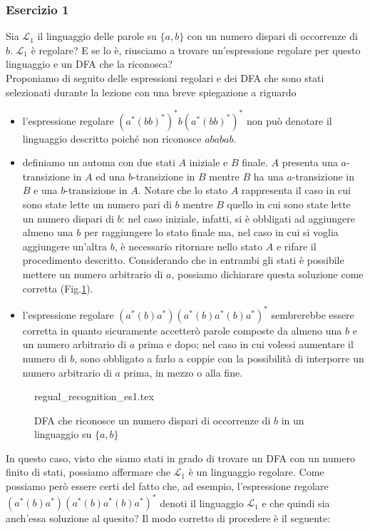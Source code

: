 \documentclass[class=book, crop=false, oneside, 12pt]{standalone}
\begin{document}
\subsubsection{Esercizio 1}
Sia \(\mathcal{L}_1\) il linguaggio delle parole su \(\{a, b\}\) con un numero dispari di occorrenze di \(b\). \(\mathcal{L}_1\) è regolare? E se lo è, riusciamo a trovare un'espressione regolare per questo linguaggio e un DFA che la riconosca? \\
Proponiamo di seguito delle espressioni regolari e dei DFA che sono stati selezionati durante la lezione con una breve spiegazione a riguardo 
\begin{itemize}
    \item l'espressione regolare \((a^*(bb)^*)^* b(a^*(bb)^*)^*\) non può denotare il linguaggio descritto poiché non riconosce \(ababab\).
    \item definiamo un automa con due stati \(A\) iniziale e \(B\) finale. \(A\) presenta una \(a\)-transizione in \(A\) ed una \(b\)-transizione in \(B\) mentre \(B\) ha una \(a\)-transizione in \(B\) e una \(b\)-transizione in \(A\). Notare che lo stato \(A\) rappresenta il caso in cui sono state lette un numero pari di \(b\) mentre \(B\) quello in cui sono state lette un numero dispari di \(b\): nel caso iniziale, infatti, si è obbligati ad aggiungere almeno una \(b\) per raggiungere lo stato finale ma, nel caso in cui si voglia aggiungere un'altra \(b\), è necessario ritornare nello stato \(A\) e rifare il procedimento descritto. Considerando che in entrambi gli stati è possibile mettere un numero arbitrario di \(a\), possiamo dichiarare questa soluzione come corretta (Fig.\ref{fig:b_dispari}).
    \item l'espressione regolare \((a^*(b)a^*)(a^*(b)a^*(b)a^*)^*\) sembrerebbe essere corretta in quanto sicuramente accetterò parole composte da almeno una \(b\) e un numero arbitrario di \(a\) prima e dopo; nel caso in cui volessi aumentare il numero di \(b\), sono obbligato a farlo a coppie con la possibilità di interporre un numero arbitrario di \(a\) prima, in mezzo o alla fine. 
\end{itemize}
\begin{figure}[H]
    \centering
    {regual_recognition_es1.tex}
    \caption{DFA che riconosce un numero dispari di occorrenze di \(b\) in un linguaggio su \(\{a,b\}\)}
    \label{fig:b_dispari}
\end{figure}
In questo caso, visto che siamo stati in grado di trovare un DFA con un numero finito di stati, possiamo affermare che \(\mathcal{L}_1\) è un linguaggio regolare. Come possiamo però essere certi del fatto che, ad esempio, l'espressione regolare \((a^*(b)a^*)(a^*(b)a^*(b)a^*)^*\) denoti il linguaggio \(\mathcal{L}_1\) e che quindi sia anch'essa soluzione al quesito? Il modo corretto di procedere è il seguente:
\end{document}
